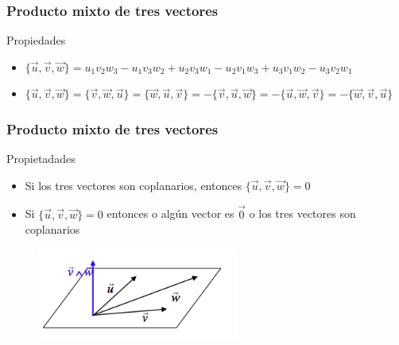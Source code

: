 \documentclass{beamer}
\begin{document}
\begin{frame}
  \frametitle{Producto mixto de tres vectores}
    \begin{block}{Propiedades}
\begin{itemize}
\item $\{\vec u, \vec v,\vec w\} = u_1v_2w_3-u_1v_3w_2+u_2v_3w_1-u_2v_1w_3+u_3v_1w_2-u_3v_2w_1$
\item $\{\vec u, \vec v,\vec w\} = \{\vec v, \vec w,\vec u\} = \{\vec w, \vec u,\vec v\} = -\{\vec v, \vec u,\vec w\} = -\{\vec u, \vec w,\vec v\} = -\{\vec w, \vec v,\vec u\}$
\end{itemize}
\end{block}

  
\end{frame}



\begin{frame}
  \frametitle{Producto mixto de tres vectores}
    \begin{block}{Propietadades}
\begin{itemize}
\item Si los tres vectores son coplanarios, entonces $\{\vec u, \vec v,\vec w\}=0$
\item Si $\{\vec u, \vec v,\vec w\}=0$ entonces o alg\'un vector es $\vec 0$ o los tres vectores son coplanarios
\end{itemize}
\end{block}

  
  \begin{figure}[h]
    \label{fig:producto mixto}
\centering
\includegraphics[height=3cm]{pte_mixt}
\end{figure}

\end{frame}
\end{document}

